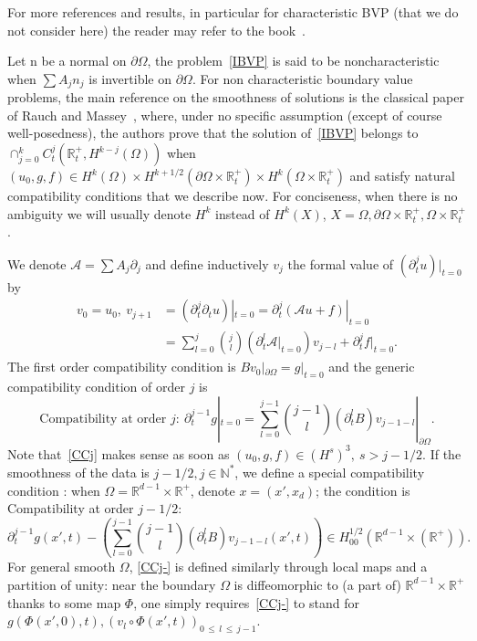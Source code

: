 \documentclass[AHL,Unicode,longabstracts,published]{cedram}
\newcommand{\R}{\mathbb{R}}
\newcommand{\N}{\mathbb{N}}
\newcommand{\rmn}{\mathrm{n}}
\newcommand{\clA}{\mathcal{A}}
\newcommand{\N}{\mathbb{N}}
\begin{document}
For more references and results, in particular for characteristic BVP (that we do not consider here) the reader may refer to the book~\cite{Benzoni3}.


Let $\rmn$ be a normal on $\partial\Omega$, the problem~\eqref{IBVP} is said to be noncharacteristic when $\sum A_jn_j$ is invertible on $\partial\Omega$. For non characteristic boundary value problems, the main reference on the smoothness of solutions is the classical paper of Rauch and Massey~\cite{RauchMassey}, where, under no specific assumption (except of course well-posedness), the authors prove that the solution of~\eqref{IBVP} belongs to $\cap_{j=0}^k C^j_t(\R^+_t,H^{k-j}(\Omega))$ when $(u_0,g,f)\in H^k(\Omega)\times H^{k+1/2}(\partial\Omega\times\R_t^+)\times H^k(\Omega\times\R_t^+)$ and satisfy natural compatibility conditions that we describe now. For conciseness, when there is no ambiguity we will usually denote $H^k$ instead of $H^k(X)$, $X=\Omega,\partial\Omega\times \R_t^+,\Omega\times \R_t^+$.


We denote $\clA=\sum A_j\partial_j$ and define inductively $v_j$ the formal value of $(\partial_t^ju)|_{t=0}$ by
\begin{equation}\label{taylor}
\begin{split}
v_0=u_0,\ v_{j+1}&=\left(\partial_t^j\partial_tu\right)|_{t=0} =\partial_t^j(\clA u+f)|_{t=0}\\ &=\sum_{l=0}^j\binom{j}{l} \left(\partial_t^l\clA|_{t=0}\right)v_{j-l}+\partial_t^jf|_{t=0}.
\end{split}
\end{equation}
The first order compatibility condition is $Bv_0|_{\partial\Omega}=g|_{t=0}$ and the generic compatibility condition of order $j$ is
\begin{equation}\label{CCj}
\text{Compatibility at order }j:\
\partial_t^{j-1}g|_{t=0}=\sum_{l=0}^{j-1}
\binom{j-1}{l}(\partial_t^lB)v_{j-1-l}|_{\partial\Omega}.
\end{equation}
Note that~\eqref{CCj} makes sense as soon as $(u_0,g,f)\in (H^s)^3,\ s>j-1/2$. If the smoothness of the data is $j-1/2, j\in \N^*$, we define a special compatibility condition : when $\Omega=\R^{d-1}\times \R^+$, denote $x=(x',x_d)$; the condition is Compatibility at order $j-1/2$:
\begin{equation}\label{CCj-}
\partial_t^{j-1}g(x',t)-\left(\sum_{l=0}^{j-1}
\binom{j-1}{l}(\partial_t^lB)v_{j-1-l}(x',t)\right)
\in H^{1/2}_{00}\left(\R^{d-1}\times (\R^+)\right).
\end{equation}
For general smooth $\Omega$, \eqref{CCj-} is defined similarly through local maps and a partition of unity: near the boundary $\Omega$ is diffeomorphic to (a part of) $\R^{d-1}\times \R^+$ thanks to some map $\Phi$, one simply requires~\eqref{CCj-} to stand for $g(\Phi(x',0),t), (v_l\circ\Phi(x',t))_{0\,\leq\,l\,\leq\,j-1}$.
\end{document}
